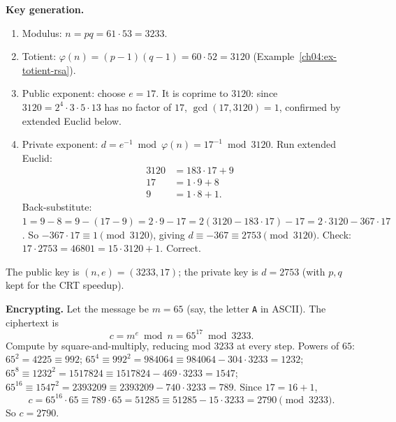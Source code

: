 \textbf{Key generation.}
\begin{enumerate}
\item Modulus: $n = pq = 61 \cdot 53 = 3233$.
\item Totient: $\varphi(n) = (p-1)(q-1) = 60 \cdot 52 = 3120$
      (Example~\ref{ch04:ex-totient-rsa}).
\item Public exponent: choose $e = 17$. It is coprime to $3120$: since
      $3120 = 2^4 \cdot 3 \cdot 5 \cdot 13$ has no factor of $17$, $\gcd(17, 3120) = 1$, confirmed
      by extended Euclid below.
\item Private exponent: $d = e^{-1} \bmod \varphi(n) = 17^{-1} \bmod 3120$. Run extended Euclid:
      \[
      \begin{aligned}
      3120 &= 183 \cdot 17 + 9 \\
        17 &= 1 \cdot 9 + 8 \\
         9 &= 1 \cdot 8 + 1.
      \end{aligned}
      \]
      Back-substitute: $1 = 9 - 8 = 9 - (17 - 9) = 2\cdot 9 - 17 = 2(3120 - 183\cdot 17) - 17
      = 2\cdot 3120 - 367\cdot 17$. So $-367 \cdot 17 \equiv 1 \pmod{3120}$, giving
      $d \equiv -367 \equiv 2753 \pmod{3120}$.
      Check: $17 \cdot 2753 = 46801 = 15 \cdot 3120 + 1$. Correct.
\end{enumerate}
The public key is $(n, e) = (3233, 17)$; the private key is $d = 2753$ (with $p, q$ kept for the
CRT speedup).

\textbf{Encrypting.} Let the message be $m = 65$ (say, the letter \texttt{A} in ASCII). The
ciphertext is
\[
  c = m^e \bmod n = 65^{17} \bmod 3233.
\]
Compute by square-and-multiply, reducing mod $3233$ at every step. Powers of $65$:
$65^2 = 4225 \equiv 992$; $65^4 \equiv 992^2 = 984064 \equiv 984064 - 304\cdot 3233 = 1232$;
$65^8 \equiv 1232^2 = 1517824 \equiv 1517824 - 469\cdot 3233 = 1547$;
$65^{16} \equiv 1547^2 = 2393209 \equiv 2393209 - 740\cdot 3233 = 789$. Since
$17 = 16 + 1$,
\[
  c = 65^{16} \cdot 65 \equiv 789 \cdot 65 = 51285 \equiv 51285 - 15\cdot 3233 = 2790 \pmod{3233}.
\]
So $c = 2790$.

